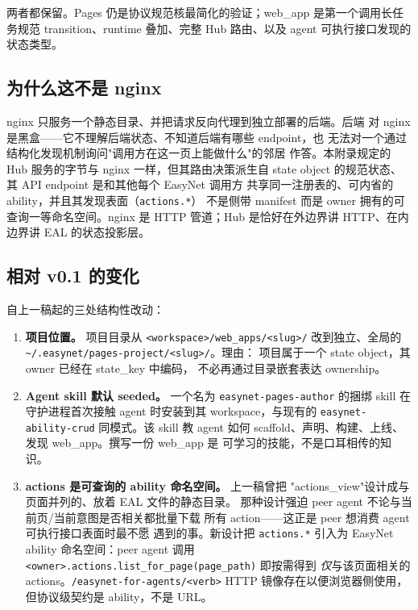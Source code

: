 \documentclass[11pt,a4paper]{article}
\theoremstyle{definition}
\begin{document}
\noindent 两者都保留。Pages 仍是协议规范核最简化的验证；web\_app
是第一个调用长任务规范 transition、runtime 叠加、完整 Hub 路由、以及
agent 可执行接口发现的状态类型。

\subsection{为什么这不是 nginx}

nginx 只服务一个静态目录、并把请求反向代理到独立部署的后端。后端
对 nginx 是黑盒——它不理解后端状态、不知道后端有哪些 endpoint，也
无法对一个通过结构化发现机制询问"调用方在这一页上能做什么"的邻居
作答。本附录规定的 Hub 服务的字节与 nginx 一样，但其路由决策派生自
state object 的规范状态、其 API endpoint 是和其他每个 EasyNet 调用方
共享同一注册表的、可内省的 ability，并且其发现表面（\texttt{actions.*}）
不是侧带 manifest 而是 owner 拥有的可查询一等命名空间。nginx 是 HTTP
管道；Hub 是恰好在外边界讲 HTTP、在内边界讲 EAL 的状态投影层。

\subsection{相对 v0.1 的变化}

自上一稿起的三处结构性改动：

\begin{enumerate}[leftmargin=2em,itemsep=0.18em]
    \item \textbf{项目位置。} 项目目录从
    \texttt{<workspace>/web\_apps/<slug>/} 改到独立、全局的
    \texttt{\textasciitilde/.easynet/pages-project/<slug>/}。理由：
    项目属于一个 state object，其 owner 已经在 state\_key 中编码，
    不必再通过目录嵌套表达 ownership。

    \item \textbf{Agent skill 默认 seeded。} 一个名为
    \texttt{easynet-pages-author} 的捆绑 skill 在守护进程首次接触
    agent 时安装到其 workspace，与现有的
    \texttt{easynet-ability-crud} 同模式。该 skill 教 agent 如何
    scaffold、声明、构建、上线、发现 web\_app。撰写一份 web\_app 是
    可学习的技能，不是口耳相传的知识。

    \item \textbf{actions 是可查询的 ability 命名空间。} 上一稿曾把
    "actions\_view"设计成与页面并列的、放着 EAL 文件的静态目录。
    那种设计强迫 peer agent 不论与当前页/当前意图是否相关都批量下载
    所有 action——这正是 peer 想消费 agent 可执行接口表面时最不愿
    遇到的事。新设计把 \texttt{actions.*} 引入为 EasyNet ability
    命名空间：peer agent 调用
    \texttt{<owner>.actions.list\_for\_page(page\_path)} 即按需得到
    \emph{仅}与该页面相关的 actions。\texttt{/easynet-for-agents/<verb>}
    HTTP 镜像存在以便浏览器侧使用，但协议级契约是 ability，不是
    URL。
\end{enumerate}
\end{document}
